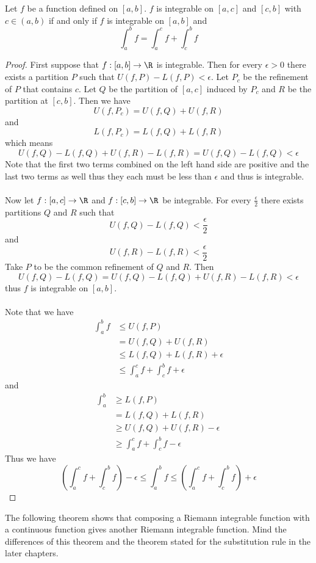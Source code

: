 \begin{thm}{}{} Let $f$ be a function defined on $[a,b]$. $f$ is integrable on $[a,c]$ and $[c,b]$ with $c\in(a,b)$ if and only if $f$ is integrable on $[a,b]$ and $$\int_{a}^{b}f=\int_{a}^{c}f+\int_{c}^{b}f$$ \tcbline
\begin{proof} First suppose that $f:[a,b]\to\R$ is integrable. Then for every $\epsilon>0$ there exists a partition $P$ such that $U(f,P)-L(f,P)<\epsilon$. Let $P_c$ be the refinement of $P$ that contains $c$. Let $Q$ be the partition of $[a,c]$ induced by $P_c$ and $R$ be the partition at $[c,b]$. Then we have $$U(f,P_c)=U(f,Q)+U(f,R)$$ and $$L(f,P_c)=L(f,Q)+L(f,R)$$ which means $$U(f,Q)-L(f,Q)+U(f,R)-L(f,R)=U(f,Q)-L(f,Q)<\epsilon$$ Note that the first two terms combined on the left hand side are positive and the last two terms as well thus they each must be less than $\epsilon$ and thus is integrable. \\~\\
Now let $f:[a,c]\to\R$ and $f:[c,b]\to\R$ be integrable. For every $\frac{\epsilon}{2}$ there exists partitions $Q$ and $R$ such that $$U(f,Q)-L(f,Q)<\frac{\epsilon}{2}$$ and $$U(f,R)-L(f,R)<\frac{\epsilon}{2}$$ Take $P$ to be the common refinement of $Q$ and $R$. Then $$U(f,Q)-L(f,Q)=U(f,Q)-L(f,Q)+U(f,R)-L(f,R)<\epsilon$$ thus $f$ is integrable on $[a,b]$. \\~\\
Note that we have 
\begin{align*}
\int_a^bf&\leq U(f,P)\\
&=U(f,Q)+U(f,R)\\
&\leq L(f,Q)+L(f,R)+\epsilon\\
&\leq\int_a^cf+\int_c^bf+\epsilon
\end{align*} and
\begin{align*}
\int_a^b&\geq L(f,P)\\
&=L(f,Q)+L(f,R)\\
&\geq U(f,Q)+U(f,R)-\epsilon\\
&\geq\int_a^cf+\int_c^bf-\epsilon
\end{align*}
Thus we have $$\left(\int_a^cf+\int_c^bf\right)-\epsilon\leq\int_a^bf\leq\left(\int_a^cf+\int_c^bf\right)+\epsilon$$
\end{proof}
\end{thm}

The following theorem shows that composing a Riemann integrable function with a continuous function gives another Riemann integrable function. Mind the differences of this theorem and the theorem stated for the substitution rule in the later chapters. 

